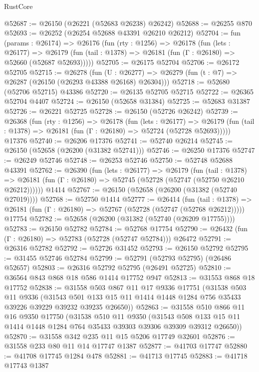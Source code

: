 \begin{lexlean}{RustCore}
\begin{coremodule}
@52687 := @26150 (@26221 (@52683 @26238) @26242)
@52688 := @26255 @870
@52693 := @26252 (@26254 @52688 @43391 @26210 @26212)
@52704 := fun (params : @26174) =>
  @26176
    (fun (rty : @1256) =>
    @26178
      (fun (lets : @26177) =>
      @26179 (fun (tail : @1378) => @26181 (fun (Γ : @26180) => @52660 (@52687 @52693)))))
@52705 := @26175 @52704
@52706 := @26172 @52705
@52715 := @26278
    (fun (U : @26277) => @26279 (fun (t : @7) => @26287 (@26150 (@26293 @43388 @26168) @26304)))
@52718 := @52680 (@52706 @52715) @43386
@52720 := @26135 @52705 @52715
@52722 := @26365 @52704 @4407
@52724 := @26150 (@52658 @31384)
@52725 := @52683 @31387
@52726 := @26221 @52725
@52728 := @26150 (@52726 @26242)
@52739 := @26368
    (fun (rty : @1256) =>
    @26178
      (fun (lets : @26177) =>
      @26179 (fun (tail : @1378) => @26181 (fun (Γ : @26180) => @52724 (@52728 @52693)))))
    @17376
@52740 := @26206 @17376
@52741 := @52740 @26214
@52745 := @26150 (@52658 (@26200 (@31382 @52741)))
@52746 := @26250 @17376
@52747 := @26249 @52746
@52748 := @26253 @52746
@52750 := @52748 @52688 @43391
@52762 := @26390
    (fun (lets : @26177) =>
    @26179
      (fun (tail : @1378) =>
      @26181 (fun (Γ : @26180) => @52745 (@52728 (@52747 (@52750 @26210 @26212))))))
    @1414
@52767 := @26150 (@52658 (@26200 (@31382 (@52740 @27019))))
@52768 := @52750 @1414
@52777 := @26414
    (fun (tail : @1378) => @26181 (fun (Γ : @26180) => @52767 (@52728 (@52747 (@52768 @26212)))))
    @17754
@52782 := @52658 (@26200 (@31382 (@52740 (@26209 @17755))))
@52783 := @26150 @52782
@52784 := @52768 @17754
@52790 := @26432 (fun (Γ : @26180) => @52783 (@52728 (@52747 @52784))) @26472
@52791 := @26316 @52782
@52792 := @52726 @31452
@52793 := @26150 @52792
@52795 := @31455 @52746 @52784
@52799 := @52791 (@52793 @52795) (@26486 @52657)
@52803 := @26316 @52792 @52795 (@26491 @52725)
@52810 := @36564 @843 @868 @18 @586 @1414 @17752 @947
@52813 := @31553 @868 @18 @17752
@52838 := @31558
    @503
    @867
    @11
    @17
    @9336
    @17751
    (@31538
      @503
      @11
      @9336
      (@31543 @501 @133 @15 @11 @1414 @1448 @1284 @756 @35433 @39226 @39229 @39232 @39235 @26650))
@52863 := @31558
    @510
    @866
    @11
    @16
    @9350
    @17750
    (@31538
      @510
      @11
      @9350
      (@31543 @508 @133 @15 @11 @1414 @1448 @1284 @764 @35433 @39303 @39306 @39309 @39312 @26650))
@52870 := @31558 @342 @235 @11 @15 @5206 @17749 @32601
@52876 := @31558 @233 @80 @11 @14 @17747 @1387
@52877 := @41703 @17747
@52880 := @41708 @17745 @1284 @478
@52881 := @41713 @17745
@52883 := @41718 @17743 @1387

\end{coremodule}
\end{lexlean}
